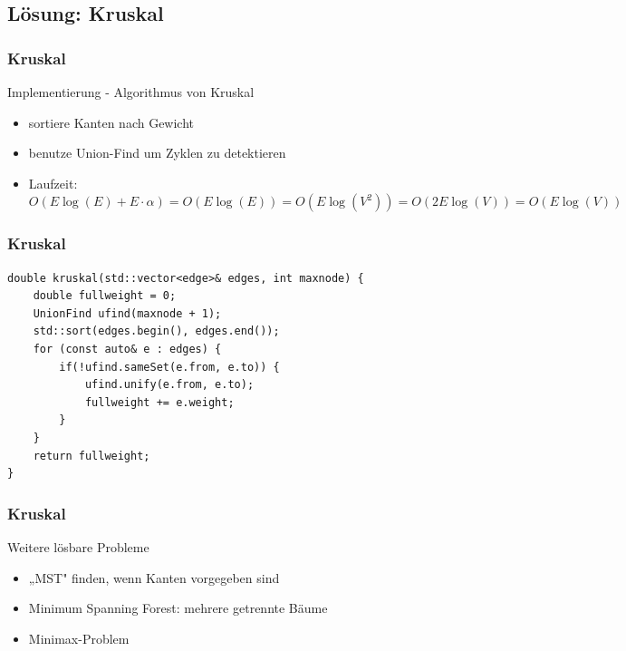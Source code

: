 \subsection{Lösung: Kruskal}

\begin{frame}
\frametitle{Kruskal}
\begin{block}{Implementierung - Algorithmus von Kruskal}
\begin{itemize}
\item sortiere Kanten nach Gewicht
\item benutze Union-Find um Zyklen zu detektieren
\item Laufzeit:\\
$O(E\log(E)+ E\cdot\alpha)=O(E\log(E))=O(E\log(V^2))=O(2E\log(V))=O(E\log(V))$
\end{itemize}
\end{block}
\end{frame}


\begin{frame}[fragile]
\frametitle{Kruskal}
\begin{lstlisting}[basicstyle=\footnotesize]
double kruskal(std::vector<edge>& edges, int maxnode) {
    double fullweight = 0;
    UnionFind ufind(maxnode + 1);
    std::sort(edges.begin(), edges.end());
    for (const auto& e : edges) {
        if(!ufind.sameSet(e.from, e.to)) {
            ufind.unify(e.from, e.to);
            fullweight += e.weight;
        }
    }
    return fullweight;
}
\end{lstlisting}
\end{frame}


\begin{frame}
\frametitle{Kruskal}
\begin{block}{Weitere lösbare Probleme}
\begin{itemize}
\item „MST" finden, wenn Kanten vorgegeben sind
\item Minimum Spanning Forest: mehrere getrennte Bäume
\item Minimax-Problem
\end{itemize}
\end{block}
\end{frame}
